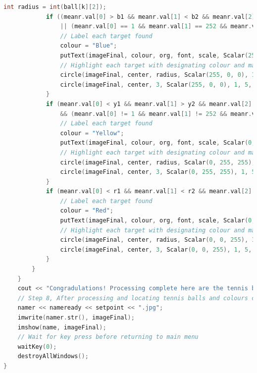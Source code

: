 \documentclass[a4paper, 10pt]{article}
\begin{document}
\begin{lstlisting}[language = C++]
			int radius = int(ball[k][2]);
			if ((meanr.val[0] > b1 && meanr.val[1] < b2 && meanr.val[2] < b3)
				|| (meanr.val[0] == 1 && meanr.val[1] == 252 && meanr.val[2] == 251)) {
				// Label each target found
				colour = "Blue";
				putText(imageFinal, colour, org, font, scale, Scalar(255, 0, 0), thick, 5);
				// Highlight each target with designating colour and mark the center points
				circle(imageFinal, center, radius, Scalar(255, 0, 0), 1, 5, 0);
				circle(imageFinal, center, 3, Scalar(255, 0, 0), 1, 5, 0);
			}
			if (meanr.val[0] < y1 && meanr.val[1] > y2 && meanr.val[2] > y3
				&& (meanr.val[0] != 1 && meanr.val[1] != 252 && meanr.val[2] != 251)) {
				// Label each target found
				colour = "Yellow";
				putText(imageFinal, colour, org, font, scale, Scalar(0, 255, 255), thick, 5);
				// Highlight each target with designating colour and mark the center points
				circle(imageFinal, center, radius, Scalar(0, 255, 255), 1, 5, 0);
				circle(imageFinal, center, 3, Scalar(0, 255, 255), 1, 5, 0);
			}			
			if (meanr.val[0] < r1 && meanr.val[1] < r2 && meanr.val[2] > r3) {
				// Label each target found
				colour = "Red";
				putText(imageFinal, colour, org, font, scale, Scalar(0, 0, 255), thick, 5);
				// Highlight each target with designating colour and mark the center points
				circle(imageFinal, center, radius, Scalar(0, 0, 255), 1, 5, 0);
				circle(imageFinal, center, 3, Scalar(0, 0, 255), 1, 5, 0);
			}
		}
	}
	cout << "Congradulations! Processing complete here are the tennis balls found with their respected colours!\n\npress any key to go back to main menu, or hit esc twice to quit\n\n-------------------------------------------------------------------------\n" << endl;
	// Step 8, After processing and locating tennis balls and colours complete, display final results, and save for reference
	namer << nameready << setpoint << ".jpg";
	imwrite(namer.str(), imageFinal);
	imshow(name, imageFinal); 
	// Wait for key press before returning to main menu
	waitKey(0);
	destroyAllWindows();
}
\end{lstlisting}
\end{document}

